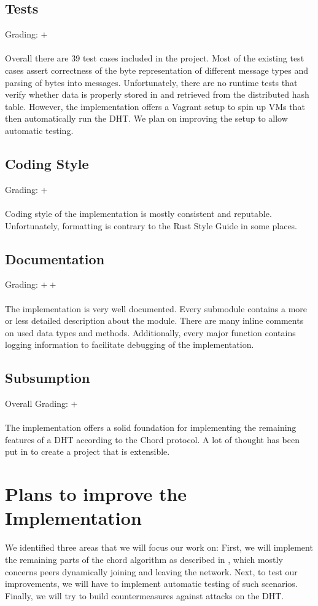 \documentclass[a4paper, 11pt]{article}
\begin{document}
\subsection*{Tests}
Grading: $+$\\
\\
Overall there are 39 test cases included in the project.
Most of the existing test cases assert correctness of the byte representation of different message types and parsing of bytes into messages.
Unfortunately, there are no runtime tests that verify whether data is properly stored in and retrieved from the distributed hash table.
However, the implementation offers a Vagrant setup to spin up VMs that then automatically run the DHT.
We plan on improving the setup to allow automatic testing.

\subsection*{Coding Style}
Grading: $+$\\
\\
Coding style of the implementation is mostly consistent and reputable.
Unfortunately, formatting is contrary to the Rust Style Guide \cite{RustStyleGuide} in some places.


\subsection*{Documentation}
Grading: $++$\\
\\
The implementation is very well documented.
Every submodule contains a more or less detailed description about the module.
There are many inline comments on used data types and methods.
Additionally, every major function contains logging information to facilitate debugging of the implementation.


\subsection*{Subsumption}
Overall Grading: $+$\\
\\
The implementation offers a solid foundation for implementing the remaining features of a DHT according to the Chord protocol. 
A lot of thought has been put in to create a project that is extensible.

\section*{Plans to improve the Implementation}
We identified three areas that we will focus our work on:
First, we will implement the remaining parts of the chord algorithm as described in \cite{stoica2001chord}, which mostly concerns peers dynamically joining and leaving the network. 
Next, to test our improvements, we will have to implement automatic testing of such scenarios.
Finally, we will try to build countermeasures against attacks on the DHT.
\end{document}
